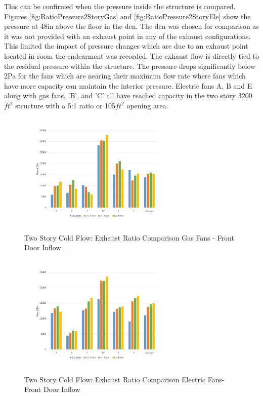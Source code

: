 \documentclass{article}
\begin{document}
This can be confirmed when the pressure inside the structure is compared. Figures \ref{fig:RatioPressure2StoryGas} and \ref{fig:RatioPressure2StoryEle} show the pressure at 48in above the floor in the den. The den was chosen for comparison as it was not provided with an exhaust point in any of the exhaust configurations. This limited the impact of pressure changes which are due to an exhaust point located in room the endearment was recorded. The exhaust flow is directly tied to the residual pressure within the structure. The pressure drops significantly below 2Pa for the fans which are nearing their maximum flow rate where fans which have more capacity can maintain the interior pressure. Electric fans A, B and E along with gas fans, 'B', and 'C' all have reached capacity in the two story 3200$ft^2$ structure with a 5:1 ratio or 105$ft^2$ opening area. 

\begin{figure}[H]
	\centering
	\includegraphics[width=3in]{0_Images/ColdFlow/Two_Story/RatioFlowDoorGas.pdf}
	\caption{Two Story Cold Flow: Exhaust Ratio Comparison Gas Fans - Front Door Inflow}
	\label{fig:RatioInflow2StoryGas}
\end{figure}

\begin{figure}[H]
	\centering
	\includegraphics[width=3in]{0_Images/ColdFlow/Two_Story/RatioFlowDoorEle.pdf}
	\caption{Two Story Cold Flow: Exhaust Ratio Comparison Electric Fans- Front Door Inflow}
	\label{fig:RatioInflow2StoryEle}
\end{figure}
\end{document}

